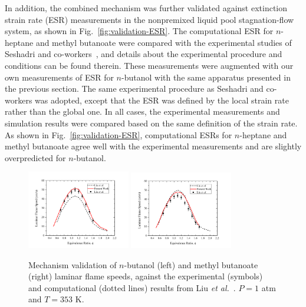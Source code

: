 \documentclass[review,3p,times]{elsarticleUS}
\begin{document}
In addition, the combined mechanism was further validated against extinction strain rate (ESR) measurements in the nonpremixed liquid pool stagnation-flow system, as shown in Fig.~\ref{fig:validation-ESR}.  The computational ESR for $n$-heptane and methyl butanoate were compared with the experimental studies of Seshadri and co-workers~\cite{seshadri08,niemann10}, and details about the experimental procedure and conditions can be found therein.  These measurements were augmented with our own measurements of ESR for $n$-butanol with the same apparatus presented in the previous section.  The same experimental procedure as Seshadri and co-workers was adopted, except that the ESR was defined by the local strain rate rather than the global one.  In all cases, the experimental measurements and simulation results were compared based on the same definition of the strain rate.  As shown in Fig.~\ref{fig:validation-ESR}, computational ESRs for $n$-heptane and methyl butanoate agree well with the experimental measurements and are slightly overpredicted for $n$-butanol.  

\begin{figure}[t]
  \centering
  \scriptsize
  \includegraphics[trim=4mm 8mm 30mm 20mm, clip=true, width=0.4\textwidth]{NB.png}
  \includegraphics[trim=4mm 8mm 30mm 20mm, clip=true, width=0.4\textwidth]{MB.png}
  \normalsize
  \vspace{-0.1in}
  \caption{Mechanism validation of $n$-butanol (left) and methyl butanoate (right) laminar flame speeds, against the experimental (symbols) and computational (dotted lines) results from Liu \emph{et al.}~\cite{liu11}. $P=1$ atm and $T=353$ K.}
  \label{fig:validation}
\end{figure}
\end{document}
